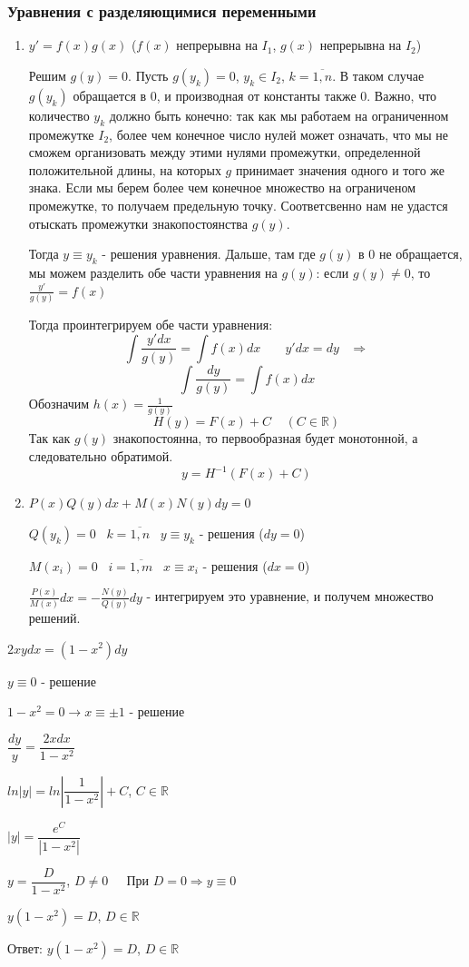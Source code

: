 \subsubsection{Уравнения с разделяющимися переменными}
\begin{enumerate}
    \item $y'=f(x)g(x)$ ($f(x)$ непрерывна на $I_1$, $g(x)$ непрерывна на $I_2$)
    \begin{nonum}
    Решим $g(y)=0$. Пусть $g(y_k)=0$, $y_k \in I_2$, $k=\overline{1,n}$. В таком случае $g(y_k)$ обращается в 0, и производная от константы также 0. Важно, что количество $y_k$ должно быть конечно: так как мы работаем на ограниченном промежутке $I_2$, более чем конечное число нулей может означать, что мы не сможем организовать между этими нулями промежутки, определенной положительной длины, на которых $g$ принимает значения одного и того же знака. Если мы берем более чем конечное множество на ограниченом промежутке, то получаем предельную точку. Соответсвенно нам не удастся отыскать промежутки знакопостоянства $g(y)$.
    
    Тогда $y\equiv y_k$ - решения уравнения.
    Дальше, там где $g(y)$ в 0 не обращается, мы можем разделить обе части уравнения на $g(y)$:
    если $g(y)\neq 0$, то $\frac{y'}{g(y)}=f(x)$
    
    Тогда проинтегрируем обе части уравнения:
    $$\int\frac{y'dx}{g(y)} = \int f(x)dx \;\;\;\;\;\;\; y'dx=dy \;\;\; \Rightarrow$$
    $$\int \frac{dy}{g(y)} = \int f(x)dx$$ Обозначим $h(x)=\frac{1}{g(y)}$
    $$H(y)=F(x)+C \;\;\;\; (C\in \mathbb{R})$$
    Так как $g(y)$ знакопостоянна, то первообразная будет монотонной, а следовательно обратимой.
    $$y=H^{-1}(F(x)+C)$$
    \end{nonum}
    \item $P(x)Q(y)dx+M(x)N(y)dy=0$
    \begin{nonum}
    $Q(y_k)=0 \;\;\; k=\overline{1, n} \;\;\; y\equiv y_k$ - решения ($dy=0$)
    
    $M(x_i)=0 \;\;\; i=\overline{1, m} \;\;\; x\equiv x_i$ - решения ($dx=0$)
    
    $\frac{P(x)}{M(x)}dx=-\frac{N(y)}{Q(y)}dy$
     - интегрируем это уравнение, и получем множество решений.
    \end{nonum}
\end{enumerate}
\begin{example}
$2xydx=(1-x^2)dy$

$y\equiv0$ - решение

$1-x^2=0 \rightarrow x \equiv \pm 1$ - решение

$\dfrac{dy}{y}=\dfrac{2xdx}{1-x^2}$

$ln\left|y\right|=ln\left|\dfrac{1}{1-x^2}\right|+C$, $C \in \mathbb{R}$

$|y|=\dfrac{e^C}{\left|1-x^2\right|}$

$y=\dfrac{D}{1-x^2}$, $D\neq0 \;\;\;\;$ При $D=0 \Rightarrow y\equiv0$

$y(1-x^2)=D$, $D\in \mathbb{R}$

Ответ: $y(1-x^2)=D$, $D \in \mathbb{R}$
\end{example}